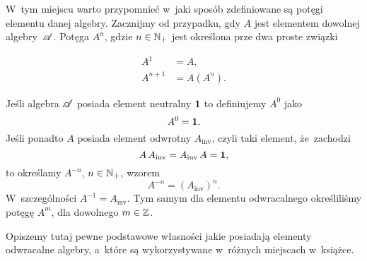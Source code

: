 \documentclass[a4paper,11pt]{article}
\begin{document}
\vspace{\VerSpaceFour}





\noindent
{} W~tym miejscu warto przypomnieć w~jaki sposób zdefiniowane są
potęgi elementu danej algebry. Zacznijmy od przypadku, gdy $A$ jest
elementem dowolnej algebry~$\mathcal{A}$. Potęga $A^{ n }$, gdzie
$n \in \mathbb{N}_{ + }$ jest określona prze dwa proste związki

\vspace{\negVerSpaceFour}


\begin{subequations}

  \begin{align}
    \label{eq:Bratteli-Robinson-Operator-Algebras-ETC-Vol-I-s01-15-A}
    A^{ 1 } &= A, \\
    \label{eq:Bratteli-Robinson-Operator-Algebras-ETC-Vol-I-s01-15-B}
    A^{ n + 1 } &= A ( A^{ n } ).
  \end{align}

\end{subequations}


\noindent
Jeśli algebra $\mathcal{A}$ posiada element neutralny $\mathbf{1}$ to definiujemy
$A^{ 0 }$ jako
\begin{equation}
  \label{eq:Bratteli-Robinson-Operator-Algebras-ETC-Vol-I-s01-16}
  A^{ 0 } = \mathbf{1}.
\end{equation}
Jeśli ponadto $A$ posiada element odwrotny $A_{ \textrm{inv} }$, czyli taki
element, że~zachodzi
\begin{equation}
  \label{eq:Bratteli-Robinson-Operator-Algebras-ETC-Vol-I-s01-17}
  A \, A_{ \textrm{inv} } = A_{ \textrm{inv} } \, A = \mathbf{1},
\end{equation}
to określamy $A^{ -n }$, $n \in \mathbb{N}_{ + }$, wzorem
\begin{equation}
  \label{eq:Bratteli-Robinson-Operator-Algebras-ETC-Vol-I-s01-18}
  A^{ -n } = ( A_{ \textrm{inv} } )^{ n }.
\end{equation}
W~szczególności $A^{ -1 } = A_{ \textrm{inv} }$. Tym samym dla elementu
odwracalnego określiliśmy potęgę $A^{ m }$, dla dowolnego $m \in \mathbb{Z}$.

\vspace{\VerSpaceFour}





\noindent
{} Opiszemy tutaj pewne podstawowe własności jakie posiadają
elementy odwracalne algebry, a~które są wykorzystywane w~różnych miejscach
w~książce.
\end{document}
